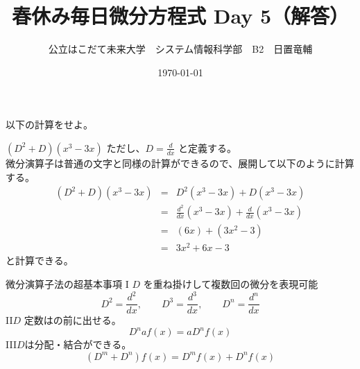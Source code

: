 \documentclass[dvipdfmx,uplatex]{jsarticle}
\title{春休み毎日微分方程式 Day 5（解答）}
\author{公立はこだて未来大学　システム情報科学部　B2　日置竜輔}
\date{\today}
\begin{document}
\begin{spacing}{1.6}
\maketitle

以下の計算をせよ。
\begin{qparts}
    \qpart $ \displaystyle (D ^ 2 + D)(x ^ 3 - 3x) $ \quad ただし、$ \displaystyle D = \frac{d}{dx} $ と定義する。\\
    微分演算子は普通の文字と同様の計算ができるので、展開して以下のように計算する。 \\
    \begin{eqnarray*}
      (D ^ 2 + D)(x ^ 3 - 3x) & = & D ^ 2 (x ^ 3 - 3x) + D (x ^ 3 - 3x)\\
      & = & \frac{d^2}{dx}(x ^ 3 - 3x) + \frac{d}{dx}(x ^ 3 - 3x)\\
      & = & (6x) + (3x ^ 2 - 3)\\
      & = & 3x ^ 2  + 6x - 3
    \end{eqnarray*}
    と計算できる。\\
    \begin{itembox}{微分演算子法の超基本事項}
      {\rm I} \quad $ D $ を重ね掛けして複数回の微分を表現可能 \\
      \begin{equation*}
        D^2 = \frac{d^2}{dx},\qquad D^3 = \frac{d ^ 3}{dx}, \qquad D ^ n = \frac{d^n}{dx}
      \end{equation*}
      {\rm II}\quad $ D $ 定数はの前に出せる。\\
      \begin{equation*}
        D^naf(x) = aD^nf(x)
      \end{equation*}
      {\rm III}\quad $ D $は分配・結合ができる。\\
      \begin{equation*}
        (D ^ m + D ^ n)f(x) = D^mf(x) + D^nf(x)
      \end{equation*}
    \end{itembox}
\end{qparts}
\end{spacing}
\end{document}

